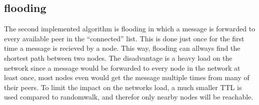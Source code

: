 \subsection{flooding}

The second implemented algorithm is flooding in which a message is forwarded to every available peer in the ``connected'' list. This is done just once for the first time a message is recieved by a node. This way, flooding can allways find the shortest path between two nodes. The disadvantage is a heavy load on the network since a message would be forwarded to every node in the network at least once, most nodes even would get the message multiple times from many of their peers. To limit the impact on the networks load, a much smaller TTL is used compared to randomwalk, and therefor only nearby nodes will be reachable.
